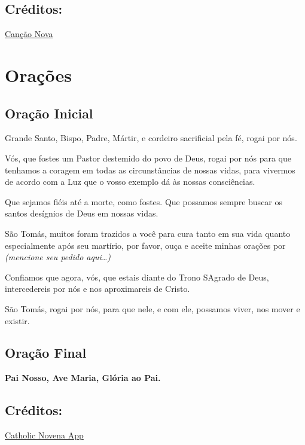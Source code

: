 \documentclass[15pt]{article}
\begin{document}
\subsection*{Créditos:}
\href{https://santo.cancaonova.com/santo/sao-tomas-becket-defensor-da-justica-e-da-igreja/}{Canção Nova}

\newpage


\section{Orações}\label{sec:Orações} %
\subsection{Oração Inicial}\label{subsec:OraçãoInicial} %

Grande Santo, Bispo, Padre, Mártir, e cordeiro sacrificial pela fé, rogai por nós.

Vós, que fostes um Pastor destemido do povo de Deus, rogai por nós para que tenhamos a coragem em todas as circunstâncias de nossas vidas, para vivermos de acordo com a Luz que o vosso exemplo dá às nossas consciências.


Que sejamos fiéis até a morte, como fostes. Que possamos sempre buscar os santos desígnios de Deus em nossas vidas.


São Tomás, muitos foram trazidos a você para cura tanto em sua vida quanto especialmente após seu martírio, por favor, ouça e aceite minhas orações por \emph{(mencione seu pedido aqui…)}


Confiamos que agora, vós, que estais diante do Trono SAgrado de Deus, intercedereis por nós e nos aproximareis de Cristo.

São Tomás, rogai por nós, para que nele, e com ele, possamos viver, nos mover e existir.

\subsection{Oração Final}\label{subsec:OraçãoFinal} %

\textbf{Pai Nosso, Ave Maria, Glória ao Pai.}

\subsection*{Créditos:}
\href{https://catholicnovenaapp.com/novenas/st-thomas-becket-novena/}{Catholic Novena App}
\end{document}
